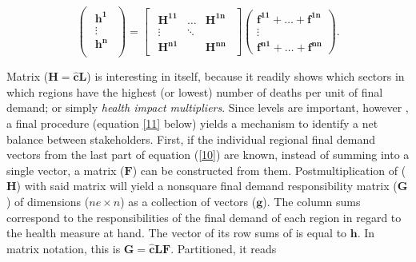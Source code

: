 \documentclass[a4paper,12pt]{article}
\begin{document}
\begin{equation} \begin{pmatrix} \begin{array}{c} \mathbf{h^1} \\ \vdots\\ \mathbf{h^n}\\ \end{array} \end{pmatrix} =\begin{bmatrix}
\begin{array}{ccc} \mathbf{H^{11}} & \ldots & \mathbf{H^{1n}} \\ \vdots &  \ddots &  \\ \mathbf{H^{n1}} &  & \mathbf{H^{nn}}
\end{array} \end{bmatrix} \left( \begin{array}{c} \mathbf{f^{11}} +  \ldots  +  \mathbf{f^{1n}} \\ \vdots  \\ \mathbf{f^{n1}}  + 
\ldots  +  \mathbf{f^{nn}} \end{array} \right).
\label{10}
\end{equation}

Matrix ($\mathbf{H}=\mathbf{\hat{c}L}$) is interesting in itself, because it readily shows which sectors in which regions have the highest (or lowest) number of deaths per unit of final demand; or simply \textit{health impact multipliers}. Since levels are important, however%
, a final procedure (equation \ref{11} below) yields a mechanism to identify a net balance between stakeholders. First, if the individual regional final demand vectors from the last part of equation (\ref{10}) are known, instead of summing into a single vector, a matrix ($\mathbf{F}
$) can be constructed from them.
Postmultiplication of  ($\mathbf{H}$)  with said matrix will yield a nonsquare final demand responsibility matrix ($\mathbf{G}$) of dimensions ($ne \times n$) as a collection of vectors ($\mathbf{g}$). The column sums correspond to the  responsibilities of the final demand of each region in regard to the health measure at hand. The vector of its row sums of is equal to $\mathbf{h}$. In matrix notation, this is $\mathbf{G}= \mathbf{\hat{c}LF}$. Partitioned, it reads 
\end{document}
